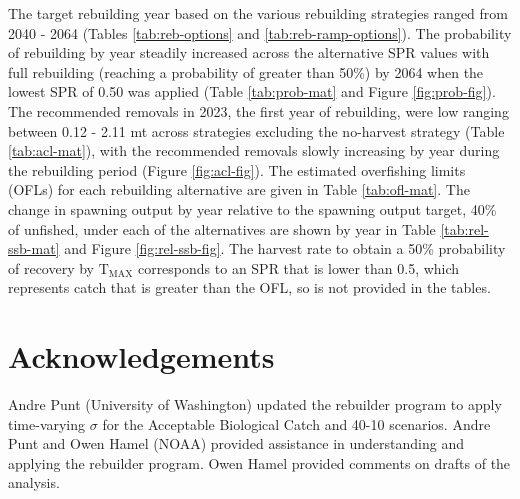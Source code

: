 \documentclass[11pt,
  english,
  letterpaper,
]{article}
\begin{document}
The target rebuilding year based on the various rebuilding strategies ranged from 2040 - 2064 (Tables \ref{tab:reb-options} and \ref{tab:reb-ramp-options}). The probability of rebuilding by year steadily increased across the alternative SPR values with full rebuilding (reaching a probability of greater than 50\%) by 2064 when the lowest SPR of 0.50 was applied (Table \ref{tab:prob-mat} and Figure \ref{fig:prob-fig}). The recommended removals in 2023, the first year of rebuilding, were low ranging between 0.12 - 2.11 mt across strategies excluding the no-harvest strategy (Table \ref{tab:acl-mat}), with the recommended removals slowly increasing by year during the rebuilding period (Figure \ref{fig:acl-fig}). The estimated overfishing limits (OFLs) for each rebuilding alternative are given in Table \ref{tab:ofl-mat}. The change in spawning output by year relative to the spawning output target, 40\% of unfished, under each of the alternatives are shown by year in Table \ref{tab:rel-ssb-mat} and Figure \ref{fig:rel-ssb-fig}. The harvest rate to obtain a 50\% probability of recovery by {\(\text{T}_\text{MAX}\)\leavevmode\tagmcend\tagstructend} corresponds to an SPR that is lower than 0.5, which represents catch that is greater than the OFL, so is not provided in the tables.

\leavevmode\tagmcend\tagstructend\par


\hypertarget{acknowledgements}{%
\section{Acknowledgements}\label{acknowledgements}}

\leavevmode\tagmcend\tagstructend


Andre Punt (University of Washington) updated the rebuilder program to apply time-varying {\(\sigma\)\leavevmode\tagmcend\tagstructend} for the Acceptable Biological Catch and 40-10 scenarios. Andre Punt and Owen Hamel (NOAA) provided assistance in understanding and applying the rebuilder program. Owen Hamel provided comments on drafts of the analysis.

\leavevmode\tagmcend\tagstructend\par

\clearpage
\end{document}
